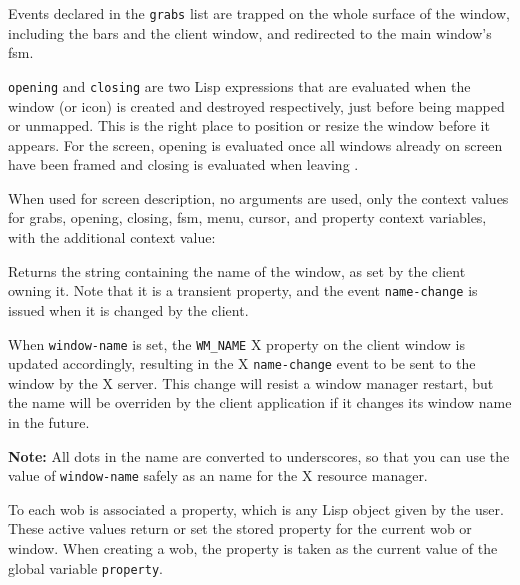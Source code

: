 Events declared in the \verb"grabs" list are trapped on the whole surface of
the window, including the bars and the client window, and redirected to the
main window's fsm.

\verb"opening" and \verb"closing" are two Lisp expressions that are
evaluated when the window (or icon) is created and destroyed respectively,
just before being mapped or unmapped. This is the right place to position or
resize the window before it appears. For the screen, opening is evaluated
once all windows already on screen have been framed and closing is evaluated
when leaving {\GWM}.

When used for screen description, no arguments are used, only the context
values for grabs, opening, closing, fsm, menu, cursor, and property context
variables, with the additional context value:


        

Returns the string containing the name of the window, as set by the client
owning it. Note that it is a transient property, and the event
\verb"name-change" is issued when it is changed by the client.  

When \verb"window-name" is set, the \verb|WM_NAME| X property on the client
window is updated accordingly, resulting in the X \verb"name-change" event to
be sent to the window by the X server. This change will resist a window
manager restart, but the name will be overriden by the client application if
it changes its window name in the future.


{\bf Note:} All dots in the name are converted to underscores, so that you
can use the value of \verb"window-name" safely as an name for the X resource
manager.

        

To each wob is associated a property, which is any Lisp object given by the
user. These active values return or set the stored property for the
current wob or window. When
creating a wob, the property is taken as the current value of the global
variable \verb"property".

